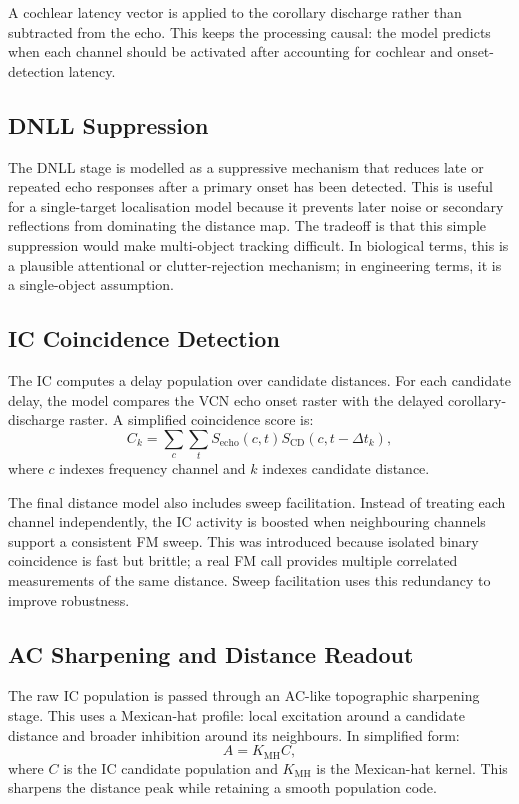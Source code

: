 A cochlear latency vector is applied to the corollary discharge rather than subtracted from the echo. This keeps the processing causal: the model predicts when each channel should be activated after accounting for cochlear and onset-detection latency.

\subsection{DNLL Suppression}

The DNLL stage is modelled as a suppressive mechanism that reduces late or repeated echo responses after a primary onset has been detected. This is useful for a single-target localisation model because it prevents later noise or secondary reflections from dominating the distance map. The tradeoff is that this simple suppression would make multi-object tracking difficult. In biological terms, this is a plausible attentional or clutter-rejection mechanism; in engineering terms, it is a single-object assumption.

\subsection{IC Coincidence Detection}

The IC computes a delay population over candidate distances. For each candidate delay, the model compares the VCN echo onset raster with the delayed corollary-discharge raster. A simplified coincidence score is:
\begin{equation}
    C_k = \sum_c \sum_t S_{\text{echo}}(c,t)S_{\text{CD}}(c,t-\Delta t_k),
\end{equation}
where $c$ indexes frequency channel and $k$ indexes candidate distance.

The final distance model also includes sweep facilitation. Instead of treating each channel independently, the IC activity is boosted when neighbouring channels support a consistent FM sweep. This was introduced because isolated binary coincidence is fast but brittle; a real FM call provides multiple correlated measurements of the same distance. Sweep facilitation uses this redundancy to improve robustness.

\subsection{AC Sharpening and Distance Readout}

The raw IC population is passed through an AC-like topographic sharpening stage. This uses a Mexican-hat profile: local excitation around a candidate distance and broader inhibition around its neighbours. In simplified form:
\begin{equation}
    A = K_{\text{MH}} C,
\end{equation}
where $C$ is the IC candidate population and $K_{\text{MH}}$ is the Mexican-hat kernel. This sharpens the distance peak while retaining a smooth population code.

